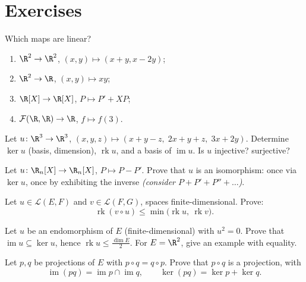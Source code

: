 \section{Exercises}

\begin{exercise}[$\star$]\label{exo:b1:linmaps:1}
Which maps are linear?
\begin{enumerate}
  \item $\R^2 \to \R^2$, $(x, y) \mapsto (x + y, x - 2y)$;
  \item $\R^2 \to \R$, $(x, y) \mapsto xy$;
  \item $\R[X] \to \R[X]$, $P \mapsto P' + XP$;
  \item $\mathcal{F}(\R,\R) \to \R$, $f \mapsto f(3)$.
\end{enumerate}
\end{exercise}

\begin{exercise}[$\star$]\label{exo:b1:linmaps:2}
Let $u \colon \R^3 \to \R^3$, $(x,y,z) \mapsto (x + y - z,\; 2x + y
+ z,\; 3x + 2y)$. Determine $\ker u$ (basis, dimension),
$\operatorname{rk} u$, and a basis of $\operatorname{im} u$. Is $u$
injective? surjective?
\end{exercise}

\begin{exercise}[$\star$]\label{exo:b1:linmaps:3}
Let $u \colon \R_n[X] \to \R_n[X]$, $P \mapsto P - P'$. Prove that
$u$ is an isomorphism: once via $\ker u$, once by exhibiting the
inverse \emph{(consider $P + P' + P'' + \dots$)}.
\end{exercise}

\begin{exercise}[$\star$]\label{exo:b1:linmaps:4}
Let $u \in \mathcal{L}(E, F)$ and $v \in \mathcal{L}(F, G)$, spaces
finite-dimensional. Prove:
\[
\operatorname{rk}(v \circ u) \leq
\min\bigl(\operatorname{rk} u,\ \operatorname{rk} v\bigr).
\]
\end{exercise}

\begin{exercise}[$\star\star$]\label{exo:b1:linmaps:5}
Let $u$ be an endomorphism of $E$ (finite-dimensional) with $u^2 =
0$. Prove that $\operatorname{im} u \subseteq \ker u$, hence
$\operatorname{rk} u \leq \frac{\dim E}{2}$. For $E = \R^2$, give an
example with equality.
\end{exercise}

\begin{exercise}[$\star\star$]\label{exo:b1:linmaps:6}
Let $p, q$ be projections of $E$ with $p \circ q = q \circ p$.
Prove that $p \circ q$ is a projection, with
\[
\operatorname{im}(pq) = \operatorname{im} p \cap \operatorname{im}
q ,
\qquad
\ker (pq) = \ker p + \ker q .
\]
\end{exercise}

